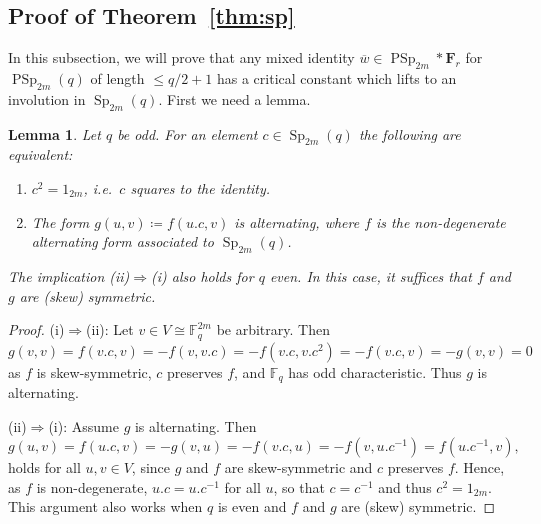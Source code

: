 \documentclass[a4paper,11pt]{amsproc}
\newcommand{\finfield}{\mathbb{F}}%
\DeclareMathOperator{\Sp}{Sp}%
\DeclareMathOperator{\PSp}{PSp}%
\newcommand{\freegrp}{\mathbf F}%
\theoremstyle{plain}
\newtheorem{lemma}{Lemma}[section]
\theoremstyle{definition}
\newtheorem{remark}[lemma]{Remark}
\begin{document}
	
	\subsection{Proof of Theorem~\ref{thm:sp}}
	
	In this subsection, we will prove that any mixed identity $\overline{w}\in\PSp_{2m}\ast\freegrp_r$ for $\PSp_{2m}(q)$ of length $\leq q/2+1$ has a critical constant which lifts to an involution in $\Sp_{2m}(q)$. First we need a lemma.
	
	\begin{lemma}\label{lem:quad_elts_alt}
		Let $q$ be odd. For an element $c\in\Sp_{2m}(q)$ the following are equivalent:
		\begin{enumerate}[\normalfont(i)]
			\item $c^2=1_{2m}$, i.e.\ $c$ squares to the identity.
			\item The form $g(u,v)\coloneqq f(u.c,v)$ is alternating, where $f$ is the non-degenerate alternating form associated to $\Sp_{2m}(q)$.
		\end{enumerate}
		The implication (ii)$\Rightarrow$(i) also holds for $q$ even. In this case, it suffices that $f$ and $g$ are (skew) symmetric.
	\end{lemma}
	
	\begin{proof}
		(i)$\Rightarrow$(ii): Let $v\in V\cong\finfield_q^{2m}$ be arbitrary. Then $g(v,v)=f(v.c,v)=-f(v,v.c)=-f(v.c,v.c^2)=-f(v.c,v)=-g(v,v)=0$ as $f$ is skew-symmetric, $c$ preserves $f$, and $\finfield_q$ has odd characteristic. Thus $g$ is alternating.
		
		(ii)$\Rightarrow$(i): Assume $g$ is alternating. Then $g(u,v)=f(u.c,v)=-g(v,u)=-f(v.c,u)=-f(v,u.c^{-1})=f(u.c^{-1},v),$ holds for all $u,v\in V$, since $g$ and $f$ are skew-symmetric and $c$ preserves $f$. Hence, as $f$ is non-degenerate, $u.c=u.c^{-1}$ for all $u$, so that $c=c^{-1}$ and thus $c^2=1_{2m}$. This argument also works when $q$ is even and $f$ and $g$ are (skew) symmetric.
	\end{proof}
	
\end{document}
